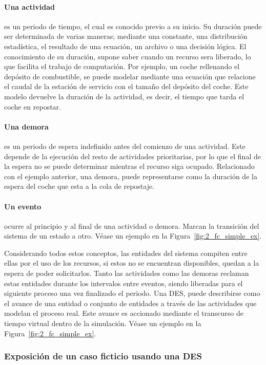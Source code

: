 \paragraph{Una actividad}
es un periodo de tiempo,
el cual es conocido previo a su inicio.
Su duración puede ser determinada de varias maneras;
mediante una constante, una distribución estadística,
el resultado de una ecuación, un archivo o una decisión lógica.
El conocimiento de su duración,
supone saber cuando un recurso sera liberado,
lo que facilita el trabajo de computación.
Por ejemplo, un coche rellenando el depósito de combustible,
se puede modelar mediante una ecuación que relacione
el caudal de la estación de servicio con el tamaño del depósito del coche.
Este modelo devuelve la duración de la actividad, es decir,
el tiempo que tarda el coche en repostar.

\paragraph{Una demora}
es un periodo de espera indefinido
antes del comienzo de una actividad.
Este depende de la ejecución
del resto de actividades prioritarias,
por lo que el final de la espera no se puede determinar
mientras el recurso siga ocupado.
Relacionado con el ejemplo anterior, una demora,
puede representarse como la duración de la espera
del coche que esta a la cola de repostaje.

\paragraph{Un evento}
ocurre al principio y al final de una actividad o demora.
Marcan la transición del sistema de un estado a otro.
Véase un ejemplo en la Figura~\ref{fig:2_fc_simple_ex}.

Considerando todos estos conceptos,
las entidades del sistema compiten entre ellas por el uso de los recursos,
si estos no se encuentran disponibles, quedan a la espera de poder solicitarlos.
Tanto las actividades como las demoras reclaman estas entidades
durante los intervalos entre eventos,
siendo liberadas para el siguiente proceso una vez finalizado el periodo.
Una DES, puede describirse como el avance de una entidad o conjunto de entidades
a través  de las actividades que modelan el proceso real.
Este avance es accionado
mediante el transcurso de tiempo virtual dentro de la simulación.
Véase un ejemplo en la Figura~\ref{fig:2_fc_simple_ex}.

\subsubsection{Exposición de un caso ficticio usando una DES}\label{example_descrp}

